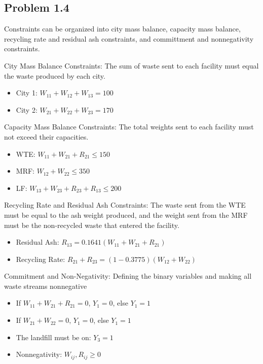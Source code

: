 \documentclass[12pt,a4paper]{article}
\begin{document}
\subsection{Problem 1.4}
Constraints can be organized into city mass balance, capacity mass balance, recycling rate and residual ash constraints, and committment and nonnegativity constraints.

City Mass Balance Constraints: The sum of waste sent to each facility must equal the waste produced by each city.

\begin{itemize}
\item City 1: $W_{11}+W_{12}+W_{13}=100$


\item City 2: $W_{21}+W_{22}+W_{23}=170$

\end{itemize}
Capacity Mass Balance Constraints: The total weights sent to each facility must not exceed their capacities.

\begin{itemize}
\item WTE: $W_{11}+W_{21}+R_{21} \leq 150$


\item MRF: $W_{12}+W_{22} \leq 350$


\item LF: $W_{13}+W_{23}+R_{23}+R_{13} \leq 200$

\end{itemize}
Recycling Rate and Residual Ash Constraints: The waste sent from the WTE must be equal to the ash weight produced, and the weight  sent from the MRF must be the non-recycled waste that entered the facility.

\begin{itemize}
\item Residual Ash: $R_{13} = 0.1641(W_{11}+W_{21}+R_{21})$


\item Recycling Rate: $R_{21}+R_{23}=(1-0.3775)(W_{12}+W_{22})$

\end{itemize}
Commitment and Non-Negativity: Defining the binary variables and making all waste streams nonnegative

\begin{itemize}
\item If $W_{11}+W_{21}+R_{21}=0$, $Y_1=0$, else $Y_1=1$


\item If $W_{21}+W_{22}=0$, $Y_1=0$, else $Y_1=1$


\item The landfill must be on: $Y_3=1$


\item Nonnegativity: $W_{ij},R_{ij} \geq 0$

\end{itemize}
\end{document}
